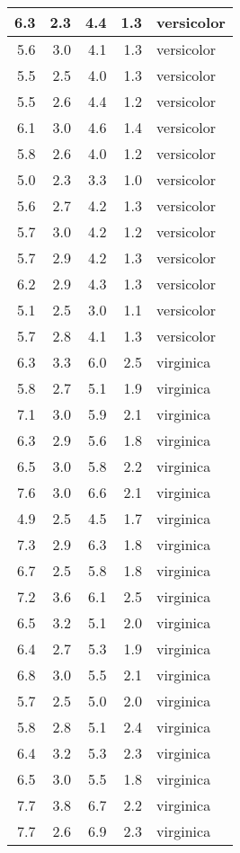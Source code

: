 \documentclass[]{article}
\begin{document}
\begin{tabular}{r|r|r|r|l}
\hline
6.3 & 2.3 & 4.4 & 1.3 & versicolor\\
\hline
5.6 & 3.0 & 4.1 & 1.3 & versicolor\\
\hline
5.5 & 2.5 & 4.0 & 1.3 & versicolor\\
\hline
5.5 & 2.6 & 4.4 & 1.2 & versicolor\\
\hline
6.1 & 3.0 & 4.6 & 1.4 & versicolor\\
\hline
5.8 & 2.6 & 4.0 & 1.2 & versicolor\\
\hline
5.0 & 2.3 & 3.3 & 1.0 & versicolor\\
\hline
5.6 & 2.7 & 4.2 & 1.3 & versicolor\\
\hline
5.7 & 3.0 & 4.2 & 1.2 & versicolor\\
\hline
5.7 & 2.9 & 4.2 & 1.3 & versicolor\\
\hline
6.2 & 2.9 & 4.3 & 1.3 & versicolor\\
\hline
5.1 & 2.5 & 3.0 & 1.1 & versicolor\\
\hline
5.7 & 2.8 & 4.1 & 1.3 & versicolor\\
\hline
6.3 & 3.3 & 6.0 & 2.5 & virginica\\
\hline
5.8 & 2.7 & 5.1 & 1.9 & virginica\\
\hline
7.1 & 3.0 & 5.9 & 2.1 & virginica\\
\hline
6.3 & 2.9 & 5.6 & 1.8 & virginica\\
\hline
6.5 & 3.0 & 5.8 & 2.2 & virginica\\
\hline
7.6 & 3.0 & 6.6 & 2.1 & virginica\\
\hline
4.9 & 2.5 & 4.5 & 1.7 & virginica\\
\hline
7.3 & 2.9 & 6.3 & 1.8 & virginica\\
\hline
6.7 & 2.5 & 5.8 & 1.8 & virginica\\
\hline
7.2 & 3.6 & 6.1 & 2.5 & virginica\\
\hline
6.5 & 3.2 & 5.1 & 2.0 & virginica\\
\hline
6.4 & 2.7 & 5.3 & 1.9 & virginica\\
\hline
6.8 & 3.0 & 5.5 & 2.1 & virginica\\
\hline
5.7 & 2.5 & 5.0 & 2.0 & virginica\\
\hline
5.8 & 2.8 & 5.1 & 2.4 & virginica\\
\hline
6.4 & 3.2 & 5.3 & 2.3 & virginica\\
\hline
6.5 & 3.0 & 5.5 & 1.8 & virginica\\
\hline
7.7 & 3.8 & 6.7 & 2.2 & virginica\\
\hline
7.7 & 2.6 & 6.9 & 2.3 & virginica\\

\end{tabular}
\end{document}
